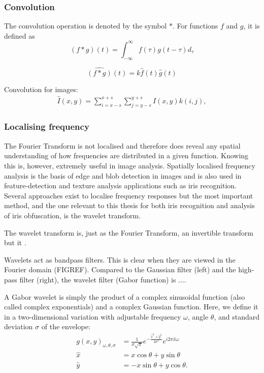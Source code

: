 \subsubsection{Convolution}

\begin{definition}[Convolution]
The convolution operation is denoted by the symbol $*$. For functions $f$ and $g$, it is defined as 
\begin{equation}
    (f*g)(t) = \int_{-\infty}^\infty f(\tau)g(t-\tau)d_\tau
\end{equation}
\end{definition}

\begin{equation}
    \widehat{(f*g)}(t) = k\hat{f}(t)\hat{g}(t)
\end{equation}

Convolution for images:
\begin{align}
    \hat{I}(x, y) = \sum_{i=x-s}^{x+s}\sum_{j=y-s}^{y+s} I(x,y)k(i,j),
\end{align}

\subsubsection{Localising frequency}
The Fourier Transform is not localised and therefore does reveal any spatial understanding of how frequencies are distributed in a given function. Knowing this is, however, extremely useful in image analysis. Spatially localised frequency analysis is the basis of edge and blob detection in images and is also used in feature-detection and texture analysis applications such as iris recognition. Several approaches exist to localise frequency responses but the most important method, and the one relevant to this thesis for both iris recognition and analysis of iris obfuscation, is the wavelet transform.

The wavelet transform is, just as the Fourier Transform, an invertible transform but it .

Wavelets act as bandpass filters. This is clear when they are viewed in the Fourier domain (FIGREF). Compared to the Gaussian filter (left) and the high-pass filter (right), the wavelet filter (Gabor function) is ....

A Gabor wavelet is simply the product of a complex sinusoidal function (also called complex exponentials) and a complex Gaussian function. Here, we define it in a two-dimensional variation with adjustable frequency $\omega$, angle $\theta$, and standard deviation $\sigma$ of the envelope:
\begin{align}
    g(x,y)_{\omega, \theta, \sigma} &= \frac{1}{\sigma\sqrt{\pi}} e^{-\frac{\hat{x}^2+\hat{y}^2}{2\sigma^2}} e^{i 2\pi \hat{x}\omega}\\
    \hat{x} &= x\cos\theta + y\sin\theta \\
    \hat{y} &= -x\sin\theta + y\cos\theta.
\end{align}
